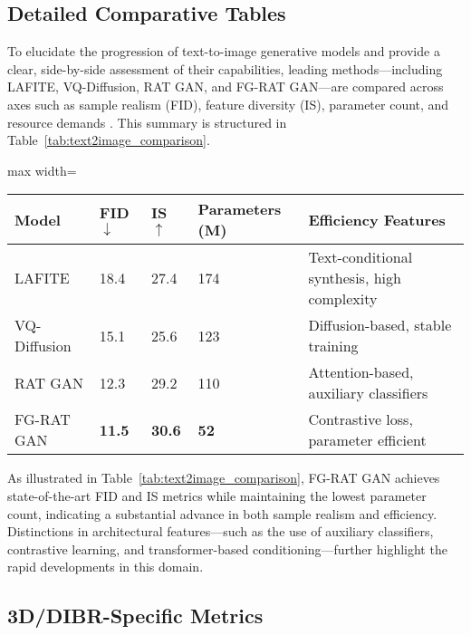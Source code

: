 \documentclass[sigconf]{acmart}
\begin{document}
\subsection{Detailed Comparative Tables}

To elucidate the progression of text-to-image generative models and provide a clear, side-by-side assessment of their capabilities, leading methods—including LAFITE, VQ-Diffusion, RAT GAN, and FG-RAT GAN—are compared across axes such as sample realism (FID), feature diversity (IS), parameter count, and resource demands \cite{ref101}. This summary is structured in Table~\ref{tab:text2image_comparison}.

\begin{table*}[htbp]
\centering
\caption{Comparison of leading text-to-image generation models on major metrics.}
\label{tab:text2image_comparison}
\begin{adjustbox}{max width=\textwidth}
\begin{tabular}{lllll}
\toprule
\textbf{Model} & \textbf{FID} $\downarrow$ & \textbf{IS} $\uparrow$ & \textbf{Parameters (M)} & \textbf{Efficiency Features} \\
\midrule
LAFITE      & 18.4    & 27.4   & 174     & Text-conditional synthesis, high complexity \\
VQ-Diffusion& 15.1    & 25.6   & 123     & Diffusion-based, stable training \\
RAT GAN     & 12.3    & 29.2   & 110     & Attention-based, auxiliary classifiers \\
FG-RAT GAN  & \textbf{11.5}    & \textbf{30.6}   & \textbf{52}      & Contrastive loss, parameter efficient \\
\bottomrule
\end{tabular}
\end{adjustbox}
\end{table*}

As illustrated in Table~\ref{tab:text2image_comparison}, FG-RAT GAN achieves state-of-the-art FID and IS metrics while maintaining the lowest parameter count, indicating a substantial advance in both sample realism and efficiency. Distinctions in architectural features—such as the use of auxiliary classifiers, contrastive learning, and transformer-based conditioning—further highlight the rapid developments in this domain.

\subsection{3D/DIBR-Specific Metrics}
\end{document}
